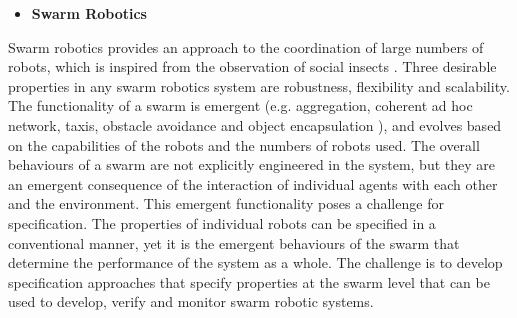 \documentclass[sigconf,nonacm]{acmart}%
\begin{document}
	\begin{itemize}[leftmargin=0.5cm]
		\item \textbf{Swarm Robotics}
	\end{itemize}
	Swarm robotics provides an approach to the coordination of large numbers of robots, which is inspired from the observation of social insects \cite{Sahin2005}. Three desirable properties in any swarm robotics system are robustness, flexibility and scalability. 
	The functionality of a swarm is emergent (e.g. aggregation, coherent ad hoc network, taxis, obstacle avoidance and object encapsulation \cite{Winfield2006}), and evolves based on the capabilities of the robots and the numbers of robots used. 
	The overall behaviours of a swarm are not explicitly engineered in the system, but they are an emergent consequence of the interaction of individual agents with each other and the environment.
	This emergent functionality poses a challenge for specification. The properties of individual robots can be specified in a conventional manner, yet it is the emergent behaviours of the swarm that determine the performance of the system as a whole. The challenge is to develop specification approaches that specify properties at the swarm level that can be used to develop, verify and monitor swarm robotic systems.
	
\end{document}
